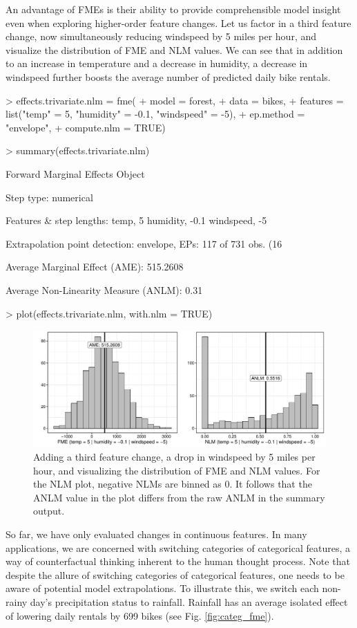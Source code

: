 \par
An advantage of FMEs is their ability to provide comprehensible model insight even when exploring higher-order feature changes. Let us factor in a third feature change, now simultaneously reducing windspeed by 5 miles per hour, and visualize the distribution of FME and NLM values. We can see that in addition to an increase in temperature and a decrease in humidity, a decrease in windspeed further boosts the average number of predicted daily bike rentals.
\begin{example}
> effects.trivariate.nlm = fme(
+   model = forest,
+   data = bikes,
+   features = list("temp" = 5, "humidity" = -0.1, "windspeed" = -5),
+   ep.method = "envelope",
+   compute.nlm = TRUE)

> summary(effects.trivariate.nlm)

Forward Marginal Effects Object

Step type:
  numerical

Features & step lengths:
  temp, 5
  humidity, -0.1
  windspeed, -5

Extrapolation point detection:
  envelope, EPs: 117 of 731 obs. (16 %

Average Marginal Effect (AME):
  515.2608

Average Non-Linearity Measure (ANLM):
  0.31 

> plot(effects.trivariate.nlm, with.nlm = TRUE)
\end{example}
\begin{figure}[H]
    \centering
    \includegraphics[width = \textwidth]{figures/ptriv_nlm.pdf}
    \caption{Adding a third feature change, a drop in  windspeed by 5 miles per hour, and visualizing the distribution of FME and NLM values. For the NLM plot, negative NLMs are binned as 0. It follows that the ANLM value in the plot differs from the raw ANLM in the summary output.}
    \label{fig:trivariate_change}
\end{figure}
\par So far, we have only evaluated changes in continuous features. In many applications, we are concerned with switching categories of categorical features, a way of counterfactual thinking inherent to the human thought process. Note that despite the allure of switching categories of categorical features, one needs to be aware of potential model extrapolations. To illustrate this, we switch each non-rainy day's precipitation status to rainfall. Rainfall has an average isolated effect of lowering daily rentals by 699 bikes (see Fig. \ref{fig:categ_fme}). 

